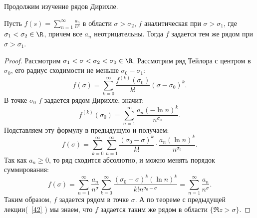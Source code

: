 Продолжим изучение рядов Дирихле.

\begin{theorem}
  \label{series extending}
  Пусть $ f(s) = \sum\limits_{n=1}^\infty \frac{a_n}{n^s}$ в области $\sigma > \sigma_2$, $f$ аналитическая при $\sigma > \sigma_1$, где $\sigma_1 < \sigma_2 \in \R$, причем все $a_n$ неотрицательны. Тогда $f$ задается тем же рядом при $\sigma > \sigma_1$.
\end{theorem}
\begin{proof}
  Рассмотрим $\sigma_1 < \sigma < \sigma_2 < \sigma_0 \in \R$. Рассмотрим ряд Тейлора с центром в $\sigma_0$, его радиус сходимости не меньше $\sigma_0 - \sigma_1$:
  $$
    f(\sigma) = \sum_{k=0}^{\infty} \frac{f^{(k)}(\sigma_0)}{k!} (\sigma - \sigma_0)^k.
  $$
  В точке $\sigma_0$ $f$ задается рядом Дирихле, значит:
  $$
    f^{(k)}(\sigma_0) = \sum_{n=1}^{\infty} \frac{a_n (-\ln n)^k}{n^{\sigma_0}}.
  $$
  Подставляем эту формулу в предыдущую и получаем:
  $$
    f(\sigma) = \sum_{k=0}^{\infty} \sum_{n=1}^{\infty} \frac{(\sigma_0 - \sigma)^k}{k!} \cdot \frac{a_n (\ln n)^k}{n^{\sigma_0}}.
  $$
  Так как $a_n \geq 0$, то ряд сходится абсолютно, и можно менять порядок суммирования:
  $$
    f(\sigma) = \sum_{n=1}^{\infty} \frac{a_n}{n^{\sigma}} \sum_{k=0}^{\infty} \frac{(\sigma_0 - \sigma)^k (\ln n)^k}{k! n^{\sigma_0-\sigma}} = \sum_{n=1}^{\infty} \frac{a_n}{n^{\sigma}}.
  $$
  Таким образом, $f$ задается рядом в точке $\sigma$. А по теореме с предыдущей лекции(~\ref{42} ) мы знаем, что $f$ задается таким же рядом в области $\{\Re z > \sigma\}$.
\end{proof}

